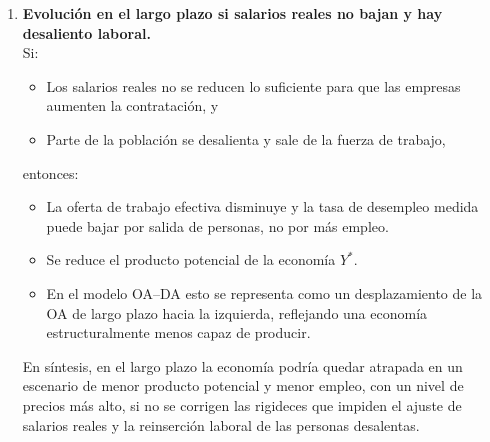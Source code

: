 \documentclass[11pt,addpoints]{article}
\begin{document}
\begin{enumerate}[label=\alph*)]
  En un escenario donde el shock es persistente (costos laborales estructuralmente más altos), el resultado de mediano plazo es un nivel de precios más alto y un producto de equilibrio menor en comparación con la situación previa.

  \item \textbf{Evolución en el largo plazo si salarios reales no bajan y hay desaliento laboral.}\\[0.1cm]
  Si:
  \begin{itemize}
    \item Los salarios reales no se reducen lo suficiente para que las empresas aumenten la contratación, y
    \item Parte de la población se desalienta y sale de la fuerza de trabajo,
  \end{itemize}
  entonces:
  \begin{itemize}
    \item La oferta de trabajo efectiva disminuye y la tasa de desempleo medida puede bajar por salida de personas, no por más empleo.
    \item Se reduce el producto potencial de la economía $Y^*$.
    \item En el modelo OA–DA esto se representa como un desplazamiento de la OA de largo plazo hacia la izquierda, reflejando una economía estructuralmente menos capaz de producir.
  \end{itemize}

  En síntesis, en el largo plazo la economía podría quedar atrapada en un escenario de menor producto potencial y menor empleo, con un nivel de precios más alto, si no se corrigen las rigideces que impiden el ajuste de salarios reales y la reinserción laboral de las personas desalentas.
\end{enumerate}
\end{document}
